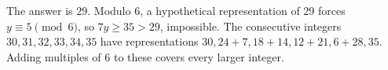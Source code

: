 The answer is $\boxed{29}$. Modulo 6, a hypothetical representation of 29 forces $y\equiv 5\pmod{6}$, so $7y\ge 35>29$, impossible. The consecutive integers $30,31,32,33,34,35$ have representations $30,24+7,18+14,12+21,6+28,35$. Adding multiples of 6 to these covers every larger integer.
